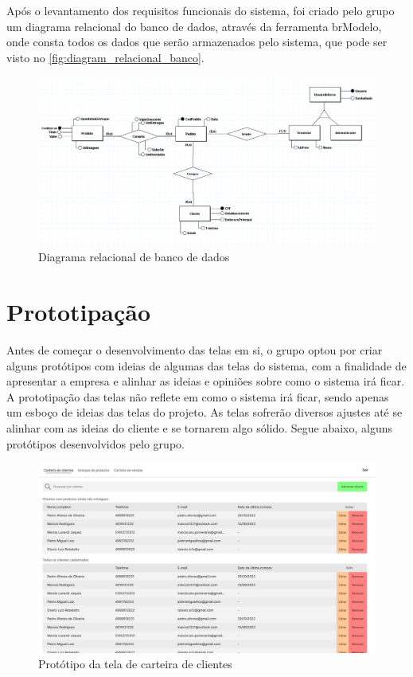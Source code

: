 \documentclass[serif, english, brazilian, oneside]{uffstex}
\begin{document}
Após o levantamento dos requisitos funcionais do sistema, foi criado pelo grupo um diagrama relacional do banco de dados, através da ferramenta brModelo, onde consta todos os dados que serão armazenados pelo sistema, que pode ser visto no \autoref{fig:diagram_relacional_banco}.

\begin{figure}[!htpb]
    \centering
    \caption{Diagrama relacional de banco de dados}
    \label{fig:diagram_relacional_banco}
    \includegraphics[width=\linewidth]{imagens/diagrama_relacional_bd.png}
\end{figure}

\newpage

\section{Prototipação}

Antes de começar o desenvolvimento das telas em si, o grupo optou por criar alguns protótipos com ideias de algumas das telas do sistema, com a finalidade de apresentar a empresa e alinhar as ideias e opiniões sobre como o sistema irá ficar.
A prototipação das telas não reflete em como o sistema irá ficar, sendo apenas um esboço de ideias das telas do projeto. As telas sofrerão diversos ajustes até se alinhar com as ideias do cliente e se tornarem algo sólido.
Segue abaixo, alguns protótipos desenvolvidos pelo grupo.


\begin{figure}[!htpb]
    \centering
    \caption{Protótipo da tela de carteira de clientes}
    \label{fig:prototipo_carteira_clientes}
    \includegraphics[width=\linewidth]{imagens/prototipo_carteira_clientes.jpeg}
\end{figure}
\end{document}
